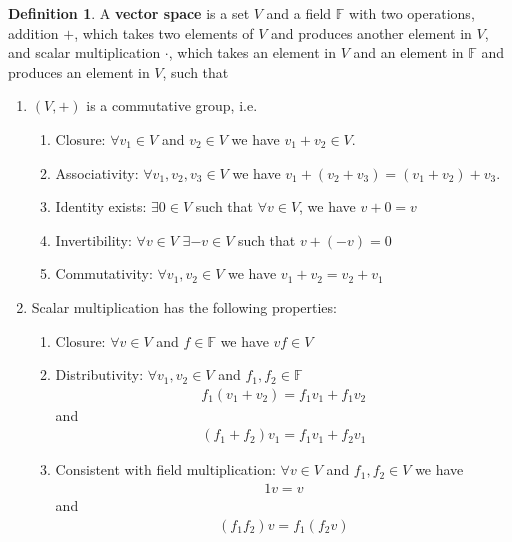 \documentclass[12pt,reqno]{amsart}
\def\F{\mathbb{F}}
\theoremstyle{definition}
\newtheorem{definition}{Definition}[section]
\begin{document}
\begin{definition}
  A \textbf{vector space} is a set $V$ and a field $\mathbb{F}$ with
  two operations, addition $+$, which takes two elements of $V$ and
  produces another element in $V$, and scalar multiplication $\cdot$,
  which takes an element in $V$ and an element in $\mathbb{F}$ and
  produces an element in $V$, such that
  \begin{enumerate}
  \item $(V, +)$ is a commutative group, i.e.
    \begin{enumerate}
    \item Closure: $\forall v_1 \in V$ and $v_2 \in V$ we have $v_1
      + v_2 \in V$. 
    \item Associativity: $\forall v_1, v_2, v_3 \in V$ we have $v_1
      + (v_2 + v_3 ) = (v_1 + v_2) + v_3 $. 
    \item Identity exists: $\exists 0 \in V$ such that $\forall v \in
      V$, we have $v + 0 = v$
    \item Invertibility: $\forall v \in V$ $\exists -v \in V$ such
      that $v + (-v) = 0$
    \item Commutativity: $\forall v_1, v_2 \in V$ we have $v_1+v_2 =
      v_2 + v_1$
    \end{enumerate}
  \item Scalar multiplication has the following properties:
    \begin{enumerate}
    \item Closure: $\forall v \in V$ and $f \in \F$ we have $vf \in V$
    \item Distributivity: $\forall v_1 , v_2 \in V$ and $f_1, f_2 \in
      \F$
      \begin{align*}
        f_1 (v_1 + v_2) = f_1 v_1 + f_1 v_2 
      \end{align*}
      and 
      \begin{align*}
        (f_1 + f_2)v_1 = f_1 v_1 + f_2 v_1
      \end{align*}
    \item Consistent with field multiplication: $\forall v \in V$ and
      $f_1, f_2 \in V$ we have
      \begin{align*}
        1 v = v
      \end{align*}
      and 
      \begin{align*}
        (f_1 f_2) v =f_1 (f_2 v)
      \end{align*}
    \end{enumerate}
  \end{enumerate}
\end{definition}
\end{document}
